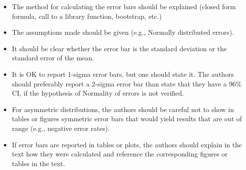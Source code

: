 \documentclass{article}
\theoremstyle{definition}
\theoremstyle{remark}
\theoremstyle{remark}
\begin{document}
\begin{enumerate}
\begin{itemize}
        \item The method for calculating the error bars should be explained (closed form formula, call to a library function, bootstrap, etc.)
        \item The assumptions made should be given (e.g., Normally distributed errors).
        \item It should be clear whether the error bar is the standard deviation or the standard error of the mean.
        \item It is OK to report 1-sigma error bars, but one should state it. The authors should preferably report a 2-sigma error bar than state that they have a 96\% CI, if the hypothesis of Normality of errors is not verified.
        \item For asymmetric distributions, the authors should be careful not to show in tables or figures symmetric error bars that would yield results that are out of range (e.g., negative error rates).
        \item If error bars are reported in tables or plots, the authors should explain in the text how they were calculated and reference the corresponding figures or tables in the text.
    \end{itemize}


\end{enumerate}
\end{document}

